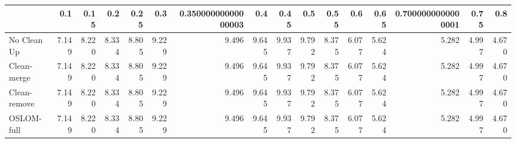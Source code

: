 \begin{tabular}{lrrrrrrrrrrrrrrr}
\toprule
{} &   0.1 &  0.15 &   0.2 &  0.25 &   0.3 & 0.35000000000000003 &   0.4 &  0.45 &   0.5 &  0.55 &   0.6 &  0.65 & 0.7000000000000001 &  0.75 &   0.8 \\
\midrule
No Clean Up  & 7.149 & 8.220 & 8.334 & 8.805 & 9.229 &               9.496 & 9.645 & 9.937 & 9.792 & 8.375 & 6.077 & 5.624 &              5.282 & 4.997 & 4.670 \\
Clean-merge  & 7.149 & 8.220 & 8.334 & 8.805 & 9.229 &               9.496 & 9.645 & 9.937 & 9.792 & 8.375 & 6.077 & 5.624 &              5.282 & 4.997 & 4.670 \\
Clean-remove & 7.149 & 8.220 & 8.334 & 8.805 & 9.229 &               9.496 & 9.645 & 9.937 & 9.792 & 8.375 & 6.077 & 5.624 &              5.282 & 4.997 & 4.670 \\
OSLOM-full   & 7.149 & 8.220 & 8.334 & 8.805 & 9.229 &               9.496 & 9.645 & 9.937 & 9.792 & 8.375 & 6.077 & 5.624 &              5.282 & 4.997 & 4.670 \\
\bottomrule
\end{tabular}
